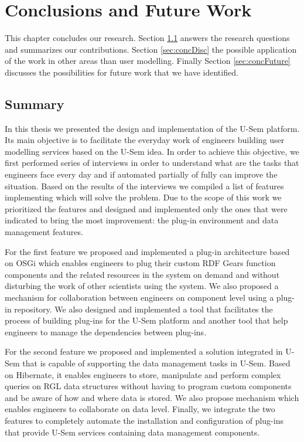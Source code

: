 
\chapter{\label{cha:conclusions}Conclusions and Future Work}

This chapter concludes our research. Section \ref{sec:concSumm} answers the research questions and summarizes our contributions. Section \ref{sec:concDisc} the possible application of the work in other areas than user modelling. Finally Section \ref{sec:concFuture} discusses the possibilities for future work that we have identified.


\section{Summary}
\label{sec:concSumm}

In this thesis we presented the design and implementation of the U-Sem platform. Its main objective is to facilitate the everyday work of engineers building user modelling services based on the U-Sem idea. In order to achieve this objective, we first performed series of interviews in order to understand what are the tasks that engineers face every day and if automated partially of fully can improve the situation. Based on the results of the interviews we compiled a list of features implementing which will solve the problem. Due to the scope of this work we prioritized the features and designed and implemented only the ones that were indicated to bring the most improvement: the plug-in environment and data management features.

For the first feature we proposed and implemented a plug-in architecture based on OSGi which enables engineers to plug their custom RDF Gears function components and the related resources in the system on demand and without disturbing the work of other scientists using the system. We also proposed a mechanism for collaboration between engineers on component level using a plug-in repository. We also designed and implemented a tool that facilitates the process of building plug-ins for the U-Sem platform and another tool that help engineers to manage the dependencies between plug-ins.

For the second feature we proposed and implemented a solution integrated in U-Sem that is capable of supporting the data management tasks in U-Sem. Based on Hibernate, it enables engineers to store, manipulate and perform complex queries on RGL data structures without having to program custom components and be aware of how and where data is stored. We also propose mechanism which enables engineers to collaborate on data level. Finally, we integrate the two features to completely automate the installation and configuration of plug-ins that provide U-Sem services containing data management components.


